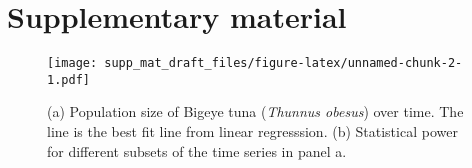 \documentclass[12pt,]{article}
\begin{document}
\section{Supplementary material}\label{supplementary-material}

\setcounter{figure}{0} \renewcommand{\thefigure}{S\arabic{figure}}

\begin{figure}[htbp]
\centering
\texttt{[image: supp\_mat\_draft\_files/figure-latex/unnamed-chunk-2-1.pdf]}
\caption{(a) Population size of Bigeye tuna (\emph{Thunnus obesus}) over
time. The line is the best fit line from linear regresssion. (b)
Statistical power for different subsets of the time series in panel
a.\label{fig:empirical_approach_example}}
\end{figure}
\end{document}
